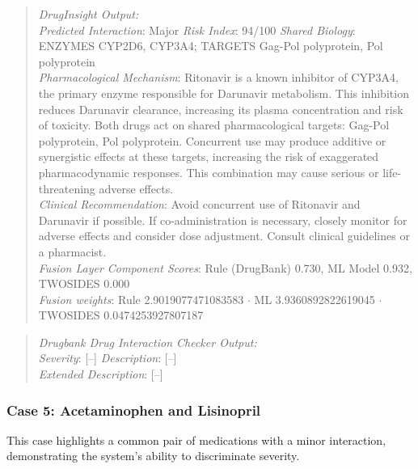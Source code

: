 \documentclass[conference]{IEEEtran}
\begin{document}
\begin{quote}
\textit{DrugInsight Output:}\\
\textit{Predicted Interaction}: Major \newline\quad \textit{Risk Index}: 94/100\newline
\quad \textit{Shared Biology}: ENZYMES CYP2D6, CYP3A4; TARGETS Gag-Pol polyprotein, Pol polyprotein\\ \newline
\textit{Pharmacological Mechanism}: Ritonavir is a known inhibitor of CYP3A4, the primary enzyme responsible for Darunavir metabolism. This inhibition reduces Darunavir clearance, increasing its plasma concentration and risk of toxicity. Both drugs act on shared pharmacological targets: Gag-Pol polyprotein, Pol polyprotein. Concurrent use may produce additive or synergistic effects at these targets, increasing the risk of exaggerated pharmacodynamic responses. This combination may cause serious or life-threatening adverse effects. \\ \newline
\textit{Clinical Recommendation}: Avoid concurrent use of Ritonavir and Darunavir if possible. If co-administration is necessary, closely monitor for adverse effects and consider dose adjustment. Consult clinical guidelines or a pharmacist.\\ \newline
\textit{Fusion Layer Component Scores}: Rule (DrugBank) 0.730, ML Model 0.932, TWOSIDES 0.000\\ \newline
\textit{Fusion weights}: Rule 2.9019077471083583 $\cdot$ ML 3.9360892822619045 $\cdot$ TWOSIDES 0.0474253927807187
\end{quote}

\begin{quote}
\textit{Drugbank Drug Interaction Checker Output:}\\
\quad \textit{Severity}: [--] \cite{drugbankchecker}\newline
\quad \textit{Description}: [--]\\ \newline
\textit{Extended Description}: [--] \\
\end{quote}

\subsubsection{\textbf{Case 5: Acetaminophen and Lisinopril}}
This case highlights a common pair of medications with a minor interaction, demonstrating the system's ability to discriminate severity.
\end{document}
